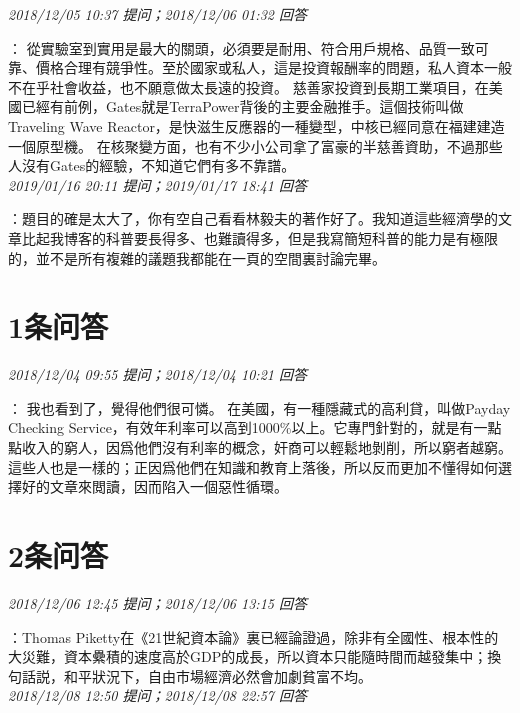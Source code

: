\documentclass[twocolumn]{ctexart}
\begin{document}
\textit{\hfill\noindent\small 2018/12/05 10:37 提问；2018/12/06 01:32 回答}

：
從實驗室到實用是最大的關頭，必須要是耐用、符合用戶規格、品質一致可靠、價格合理有競爭性。至於國家或私人，這是投資報酬率的問題，私人資本一般不在乎社會收益，也不願意做太長遠的投資。
慈善家投資到長期工業項目，在美國已經有前例，Gates就是TerraPower背後的主要金融推手。這個技術叫做Traveling Wave Reactor，是快滋生反應器的一種變型，中核已經同意在福建建造一個原型機。
在核聚變方面，也有不少小公司拿了富豪的半慈善資助，不過那些人沒有Gates的經驗，不知道它們有多不靠譜。
\\

\textit{\hfill\noindent\small 2019/01/16 20:11 提问；2019/01/17 18:41 回答}

：題目的確是太大了，你有空自己看看林毅夫的著作好了。我知道這些經濟學的文章比起我博客的科普要長得多、也難讀得多，但是我寫簡短科普的能力是有極限的，並不是所有複雜的議題我都能在一頁的空間裏討論完畢。
\\

\section{1条问答}

\textit{\hfill\noindent\small 2018/12/04 09:55 提问；2018/12/04 10:21 回答}

：
我也看到了，覺得他們很可憐。
在美國，有一種隱藏式的高利貸，叫做Payday Checking Service，有效年利率可以高到1000\%以上。它專門針對的，就是有一點點收入的窮人，因爲他們沒有利率的概念，奸商可以輕鬆地剝削，所以窮者越窮。
這些人也是一樣的；正因爲他們在知識和教育上落後，所以反而更加不懂得如何選擇好的文章來閲讀，因而陷入一個惡性循環。
\\

\section{2条问答}

\textit{\hfill\noindent\small 2018/12/06 12:45 提问；2018/12/06 13:15 回答}

：Thomas Piketty在《21世紀資本論》裏已經論證過，除非有全國性、根本性的大災難，資本纍積的速度高於GDP的成長，所以資本只能隨時間而越發集中；換句話説，和平狀況下，自由市場經濟必然會加劇貧富不均。
\\

\textit{\hfill\noindent\small 2018/12/08 12:50 提问；2018/12/08 22:57 回答}
\end{document}
